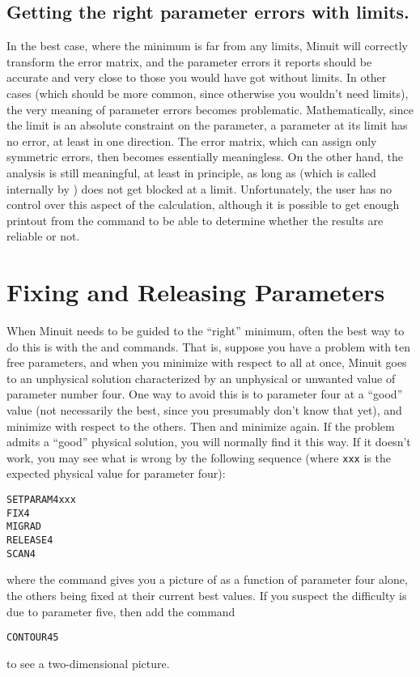 \subsection{Getting the right parameter errors with limits.}
\label{sec:right-errors}

In the best case, where the minimum is far from any limits,
Minuit will correctly transform the error matrix, and the
parameter errors it reports should be accurate and very
close to those you would have got without limits.
In other cases (which should be more common, since
otherwise you wouldn't need limits), the very meaning of
parameter errors becomes problematic.  Mathematically, since
the limit is an absolute constraint on the parameter, a parameter
at its limit has no error, at least in one direction.
The error matrix, which can assign only symmetric errors, then
becomes essentially meaningless.
On the other hand, the  analysis is still meaningful,
at least in principle, as long as  (which is called
internally by ) does not get blocked at a limit.
Unfortunately, the user has no control over this aspect of
the  calculation, although it is possible to get enough
printout from the  command to be able to determine whether
the results are reliable or not.

\section{Fixing and Releasing Parameters}

When Minuit needs to be guided to the ``right'' minimum,
often the best way to do this is with the  
and  commands.
That is, suppose you have a problem with ten free parameters,
and when you minimize with respect to all at once, Minuit goes to
an unphysical solution characterized by an unphysical or unwanted
value of parameter number four.
One way to avoid this is to  parameter four at a ``good'' value
(not necessarily the best, since you presumably don't know that yet),
and minimize with respect to the others. 
Then  and minimize again. 
If the problem admits a ``good'' physical solution, you will
normally find it this way.  
If it doesn't work,
you may see what is wrong by the following sequence
(where \texttt{xxx} is the expected physical value for parameter four):
\begin{alltt}\footnotesize
SET PARAM 4 xxx
FIX 4
MIGRAD
RELEASE 4
SCAN 4
\end{alltt}
where the  command gives you a picture of  as a 
function of parameter four alone,
the others being fixed at their current best values.
If you suspect the difficulty is due to parameter five,
then add the command
\begin{alltt}\footnotesize
CONTOUR  4  5
\end{alltt}
to see a two-dimensional picture.

